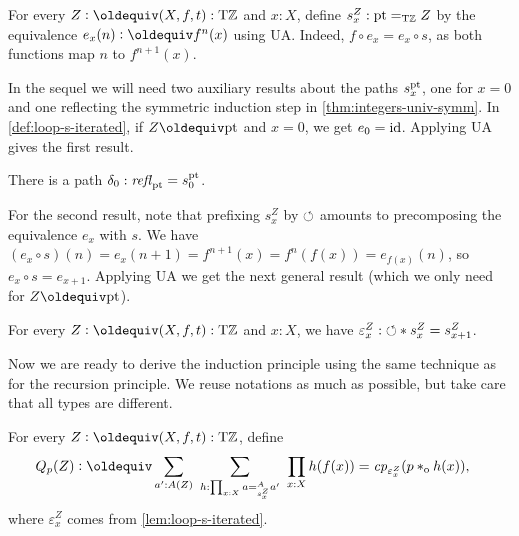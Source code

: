 \documentclass[a4,12pt]{amsart}
\begin{document}
\begin{definition}\label{def:loop-s-iterated}
For every $Z\defeq(X,f,t):\TorZ$ and $x:X$, 
define $s^Z_x: {\mathord{\mathrm{pt}}} =_{\mathrm{T}\mathbb{Z}} Z$ by the equivalence
$e_x(n)\defeq f^n(x)$ using UA. Indeed, 
$f\circ e_x = e_x \circ s$, as both functions map $n$ to $f^{n+1}(x)$. 
\end{definition}

In the sequel we will need two auxiliary results about the paths $s^{\mathord{\mathrm{pt}}}_x$,
one for $x=0$ and one reflecting the symmetric induction step in \cref{thm:integers-univ-symm}.
In \cref{def:loop-s-iterated}, if $Z\jdeq\pt$ and $x=0$, we get $e_0 = \mathord{\mathrm{id}}$.
Applying UA gives the first result.

\begin{lemma}\label{lem:s-pt-zero}
  There is a path $\delta_0 : \mathop{{\it refl}_{{\mathord{\mathrm{pt}}}}} = s^{\mathord{\mathrm{pt}}}_0$. 
\end{lemma}

For the second result, note that prefixing $s^Z_x$ by ${\circlearrowleft}$ 
amounts to precomposing the equivalence $e_x$ with $s$. 
We have $(e_x\circ s)(n) = e_x(n+1) = f^{n+1}(x) = f^n(f(x)) =e_{f(x)}(n)$,
so $e_x\circ s = e_{x+1}$. Applying UA we get the next general result
(which we only need for $Z\jdeq\pt$).

\begin{lemma}\label{lem:loop-s-iterated}
  For every $Z\defeq(X,f,t):\TorZ$ and $x:X$, we have
  ${\varepsilon^Z_x}: {\circlearrowleft} * s^Z_x = s^Z_{x+1}$. 
\end{lemma}

Now we are ready to derive the induction principle using the same 
technique as for the recursion principle. We reuse notations as much as
possible, but take care that all types are different.

\begin{definition}\label{def:guided-null-hmtps-dep}
For every $Z\defeq(X,f,t):\TorZ$, define
\begin{align*}\label{eq:TBD}
Q_p(Z)&\defeq \sum_{a' : A(Z)}~\sum_{h : \prod_{x:X} a =^A_{s^Z_x} a'}~\prod_{x:X} h(f(x)) = \cp{\varepsilon^Z_x}(p\cto h(x)),
\end{align*}
where $\varepsilon^Z_x$ comes from \cref{lem:loop-s-iterated}.
\end{definition}
\end{document}
